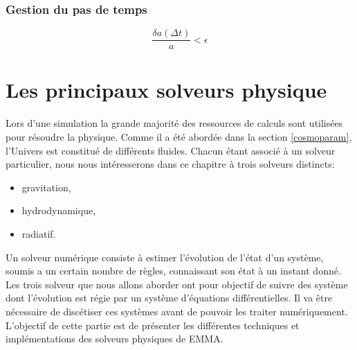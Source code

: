 \subsection{Gestion du pas de temps}


\begin{equation}
\frac{\delta a (\Delta t) } {a} < \epsilon
\end{equation}


\chapter{Les principaux solveurs physique}


Lors d'une simulation la grande majorité des ressources de calculs sont utilisées pour résoudre la physique.
Comme il a été abordée dans la section \ref{cosmoparam}, l'Univers est constitué de différents fluides.
Chacun étant associé à un solveur particulier, nous nous intéresserons dans ce chapitre à trois solveurs distincts:
\begin{itemize}
\item gravitation,
\item hydrodynamique,
\item radiatif.
\end{itemize}



Un solveur numérique consiste à estimer l'évolution de l'état d'un système, soumis a un certain nombre de règles, connaissant son état à un instant donné.
Les trois solveur que nous allons aborder ont pour objectif de suivre des système dont l'évolution est régie par un système d'équations différentielles.
Il va être nécessaire de discétiser ces systèmes avant de pouvoir les traiter numériquement.
L'objectif de cette partie est de présenter les différentes techniques et implémentations des solveurs physiques de EMMA.


